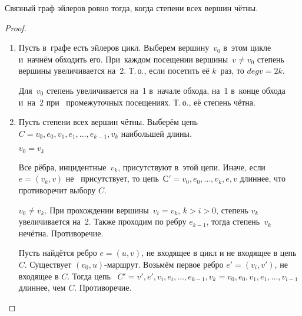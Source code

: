 \begin{theorem}
	Связный граф эйлеров ровно тогда, когда степени всех вершин чётны.
\end{theorem}
\begin{proof}
\begin{enumerate}
	\item Пусть в~графе есть эйлеров цикл. Выберем вершину~$v_0$ в~этом цикле и~начнём обходить
	его. При~каждом посещении вершины~$v \neq v_0$ степень вершины увеличивается на~2. Т.\,о., если
	посетить её $k$~раз, то $deg v = 2k$.
	
	Для~$v_0$ степень увеличивается на~1 в~начале обхода, на~1 в~конце обхода и~на~2 при
	~промежуточных посещениях. Т.\,о., её степень чётна.
	
	\item Пусть степени всех вершин чётны. Выберём цепь~$C = v_0, e_0, v_1, e_1, \ldots, e_{k-1},
	v_k$ наибольшей длины.
	
	$v_0 = v_k$
	
	Все рёбра, инцидентные~$v_k$, присутствуют в~этой цепи. Иначе, если $e = (v_k, v)$ не~
	присутствует, то цепь~$С' = v_0, e_0, \ldots, v_k, e, v$ длиннее, что противоречит выбору $C$.
	
	$v_0 \neq v_k$. При прохождении вершины~$v_i = v_k$, $k > i > 0$, степень $v_k$ увеличивается на~2. Также проходим по ребру $e_{k-1}$, тогда степень~$v_k$ нечётна. Противоречие.
	
	Пусть найдётся ребро $e = (u, v)$, не входящее в цикл и не входящее в цепь~$C$. Существует $(v_0, u)$-маршрут. Возьмём первое ребро $e' = (v_i, v')$, не входящее в $C$. Тогда цепь
	~$C' = v', e', v_i, e_i, \ldots, e_{k-1}, v_k = v_0, e_0, v_1, e_1, \ldots, v_{i-1}$ длиннее,
	чем $C$. Противоречие.
\end{enumerate}
\end{proof}

